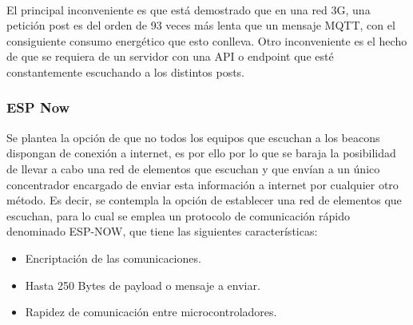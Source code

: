 \documentclass[paper=a4, fontsize=11pt,twoside]{scrartcl}	%
\begin{document}
\begin{enumerate}
            \paragraph{}
            El principal inconveniente es que está demostrado que en una red 3G, una petición post es del orden de 93 veces
            más lenta que un mensaje MQTT, con el consiguiente consumo energético que esto conlleva. Otro inconveniente es el hecho 
            de que se requiera de un servidor con una API o endpoint que esté constantemente escuchando a los distintos posts.
        \subsubsection {ESP Now}
            Se plantea la opción de que no todos los equipos que escuchan a los beacons dispongan de conexión a internet, es por ello
            por lo que se baraja la posibilidad de llevar a cabo una red de elementos que escuchan y que envían a un único concentrador encargado de enviar
            esta información a internet por cualquier otro método.
            Es decir, se contempla la opción de establecer una red de elementos que escuchan, para lo cual se emplea 
            un protocolo de comunicación rápido denominado ESP-NOW, que tiene las siguientes características:
            \begin{itemize}
                \item Encriptación de las comunicaciones.
                \item Hasta 250 Bytes de payload o mensaje a enviar.
                \item Rapidez de comunicación entre microcontroladores.
            \end{itemize}

\end{enumerate}
\end{document}
